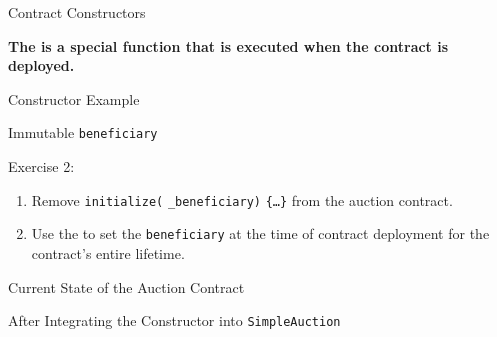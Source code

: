 \documentclass[handout]{beamer}
\begin{document}
\begin{frame}{Contract Constructors}

	\textbf{The  is a special function that is executed when the contract is deployed.}
	
	\begin{samplecode}{Constructor Example}
			
	\end{samplecode}
	
\end{frame}

\begin{frame}{Immutable \texttt{beneficiary}}

	\begin{exercise}{Exercise 2:}
		\begin{enumerate}
			\item Remove  \texttt{initialize(} \texttt{\_beneficiary)}  \texttt{\{\dots\}} from the auction contract.
			\item Use the  to set the \texttt{beneficiary} at the time of contract deployment for the contract's entire lifetime.
		\end{enumerate}
	\end{exercise}
		
	
\end{frame}

\begin{frame}{Current State of the Auction Contract}
	\begin{samplecode}{After Integrating the Constructor into \texttt{SimpleAuction}}
		
	\end{samplecode}
\end{frame}
\end{document}
